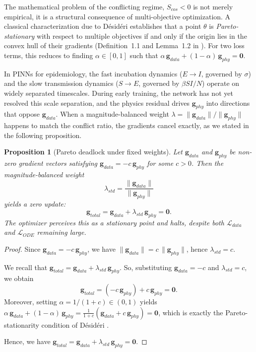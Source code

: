 \documentclass[11pt]{article}
\newtheorem{proposition}[thm]{Proposition}
\begin{document}
The mathematical problem of the conflicting regime, $S_{cos} < 0$ is not merely empirical, it is a structural consequence of multi-objective optimization. A classical characterization due to D\'{e}sid\'{e}ri \cite{desideri2012multiple} establishes that a point $\theta$ is \textit{Pareto-stationary} with respect to multiple objectives if and only if the origin lies in the convex hull of their gradients (Definition~1.1 and Lemma~1.2 in \cite{desideri2012multiple}). For two loss terms, this reduces to finding $\alpha \in [0,1]$ such that $\alpha\, \mathbf{g}_{data} + (1-\alpha)\, \mathbf{g}_{phy} = \mathbf{0}$.

In PINNs for epidemiology, the fast incubation dynamics ($E \to I$, governed by $\sigma$) and the slow transmission dynamics ($S \to E$, governed by $\beta S I / N$) operate on widely separated timescales. During early training, the network has not yet resolved this scale separation, and the physics residual drives $\mathbf{g}_{phy}$ into directions that oppose $\mathbf{g}_{data}$. When a magnitude-balanced weight $\lambda = \|\mathbf{g}_{data}\|/\|\mathbf{g}_{phy}\|$ happens to match the conflict ratio, the gradients cancel exactly, as we stated in the following proposition.

\begin{proposition}[Pareto deadlock under fixed weights]
\label{prop:deadlock}
Let $\mathbf{g}_{data}$ and $\mathbf{g}_{phy}$ be non-zero gradient vectors satisfying $\mathbf{g}_{data} = -c\, \mathbf{g}_{phy}$ for some $c > 0$. Then the magnitude-balanced weight $$\lambda_{std} = \frac{\|\mathbf{g}_{data}\|}{\|\mathbf{g}_{phy}\|}  $$ yields a zero update:
\[
\mathbf{g}_{total} = \mathbf{g}_{data} + \lambda_{std}\, \mathbf{g}_{phy} = \mathbf{0}.
\]
The optimizer perceives this as a stationary point and halts, despite both $\mathcal{L}_{data}$ and $\mathcal{L}_{ODE}$ remaining large.
\end{proposition}

\begin{proof}
Since $\mathbf{g}_{data} = -c\, \mathbf{g}_{phy}$, we have $\|\mathbf{g}_{data}\| = c\,\|\mathbf{g}_{phy}\|$, hence $\lambda_{std} = c$. 

We recall that $ \mathbf{g}_{total} = \mathbf{g}_{data} + \lambda_{std}\, \mathbf{g}_{phy} $. So, substituting $\mathbf{g}_{data} = -c$ and $\lambda_{std} = c$, we obtain $$\mathbf{g}_{total} = (-c\, \mathbf{g}_{phy}) + c\, \mathbf{g}_{phy} = \mathbf{0}.$$
Moreover, setting $\alpha = 1/(1+c) \in (0,1)$ yields $\alpha\, \mathbf{g}_{data} + (1-\alpha)\, \mathbf{g}_{phy} = \frac{1}{1+c}(\mathbf{g}_{data} + c\, \mathbf{g}_{phy})  = \mathbf{0}$, which is exactly the Pareto-stationarity condition of D\'{e}sid\'{e}ri \cite{desideri2012multiple}.

Hence, we have $\mathbf{g}_{total} = \mathbf{g}_{data} + \lambda_{std}\, \mathbf{g}_{phy} = \mathbf{0}.$  
\end{proof}
\end{document}

